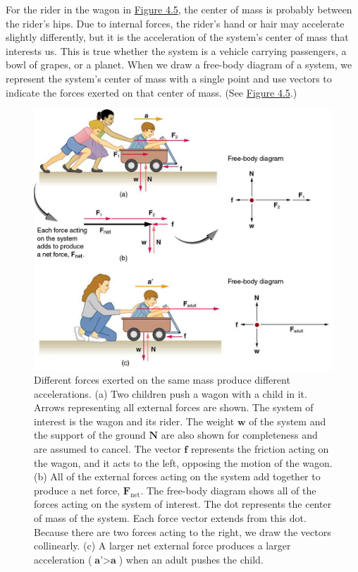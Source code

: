 \documentclass[
]{book}
\begin{document}
For the rider in the wagon in \protect\hyperlink{import-auto-id1993910}{Figure 4.5}, the
center of mass is probably between the rider's hips. Due to internal
forces, the rider's hand or hair may accelerate slightly differently,
but it is the acceleration of the system's center of mass that interests
us. This is true whether the system is a vehicle carrying passengers, a
bowl of grapes, or a planet. When we draw a free-body diagram of a
system, we represent the system's center of mass with a single point and
use vectors to indicate the forces exerted on that center of mass. (See
\protect\hyperlink{import-auto-id1993910}{Figure 4.5}.)

\begin{figure}
\hypertarget{import-auto-id1993910}{%
\centering
\includegraphics{images/Figure 04_03_01.jpg}
\caption{Different forces exerted on the same mass produce different
accelerations. (a) Two children push a wagon with a child in it. Arrows
representing all external forces are shown. The system of interest is
the wagon and its rider. The weight \(\textbf{w}{}\) of the system and the
support of the ground \(\textbf{N}{}\) are also shown for completeness and
are assumed to cancel. The vector \(\textbf{f}{}\) represents the friction
acting on the wagon, and it acts to the left, opposing the motion of the
wagon. (b) All of the external forces acting on the system add together
to produce a net force, \(\textbf{F}_{\text{net}}{}\). The free-body
diagram shows all of the forces acting on the system of interest. The
dot represents the center of mass of the system. Each force vector
extends from this dot. Because there are two forces acting to the right,
we draw the vectors collinearly. (c) A larger net external force
produces a larger acceleration (\(\textbf{a'} > \textbf{a}\)) when an
adult pushes the
child.}\label{import-auto-id1993910}
}
\end{figure}
\end{document}
